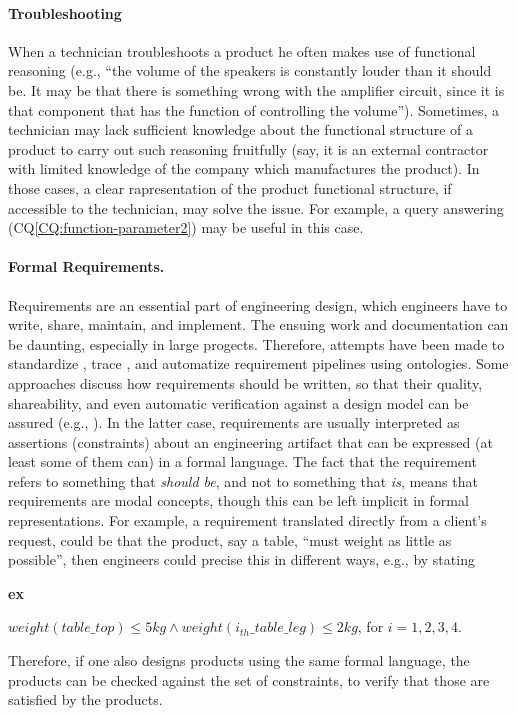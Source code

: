 \documentclass[sw]{iosart2x}
\newcommand{\bflist}{\begin{list}{}{\setlength{\topsep}{2mm}\setlength{\partopsep}{0mm}\setlength{\parsep}{0mm}\setlength{\leftmargin}{9mm}\setlength{\labelwidth}{8mm}}}
\newcommand{\eflist}{\end{list}}
\newcommand{\ExLabel}{\textrm{ex}}
\newcommand{\CQLabel}{\textrm{CQ}}
\newcommand{\myex}[1]{\refstepcounter{cntex}\begin{small}{\bf \ExLabel\thecntex\label{ex:#1}}\end{small}}
\newcounter{cntex}
\newcommand{\refCQ}[1]{({\CQLabel}\ref{#1})}
\newcommand{\qquotes}[1]{``#1''}
\newcommand{\TODO}[1]{{%
}}
\begin{document}
\paragraph{Troubleshooting} When a technician troubleshoots a product he often makes use of functional reasoning (e.g., \qquotes{the volume of the speakers is constantly louder than it should be. It may be that there is something wrong with the amplifier circuit, since it is that component that has the function of controlling the volume}). 
Sometimes, a technician may lack sufficient knowledge about the functional structure of a product to carry out such reasoning fruitfully (say, it is an external contractor with limited knowledge of the company which manufactures the product). 
In those cases, a clear rapresentation of the product functional structure, if accessible to the technician, may solve the issue.
For example, a query answering \refCQ{CQ:function-parameter2} may be useful in this  case.

\paragraph{Formal Requirements.}
Requirements are an essential part of engineering design, which engineers have to write, share, maintain, and implement. 
The ensuing work and documentation can be daunting, especially in large progects. Therefore, attempts have been made to standardize \cite{alrumaihDomainOntologyRequirements2020}, trace \cite{murtazinaOntologybasedApproachSupport2019}, and automatize \cite{holterScopeDetectionTextual2021} requirement pipelines using ontologies. 
Some approaches discuss how requirements should be written, so that their quality, shareability, and even automatic verification against a design model can be assured (e.g., \cite{jinxinlinRequirementOntologyEngineering1996, chenOntologybasedRequirementVerification2020}).
In the latter case, requirements are usually interpreted as assertions (constraints) about an engineering artifact that can be expressed (at least some of them can) in a formal language. 
The fact that the requirement refers to something that \textit{should be}, and not to something that \textit{is}, means that requirements are modal concepts, though this can be left implicit in formal representations.  
For example, a requirement translated directly from a client's request, could be that the product, say a table, \qquotes{must weight as little as possible}, then engineers could precise this in different ways, e.g., by stating 
\bflist
  \item[\myex{req1}] $ weight(table\_top) \leq 5kg \land weight(i_{th}\_table\_leg) \leq 2kg$, for $i = 1,2,3,4$. 
\eflist
Therefore, if one also designs products using the same formal language, the products can be checked against the set of constraints, to verify that those are satisfied by the products.
\end{document}
